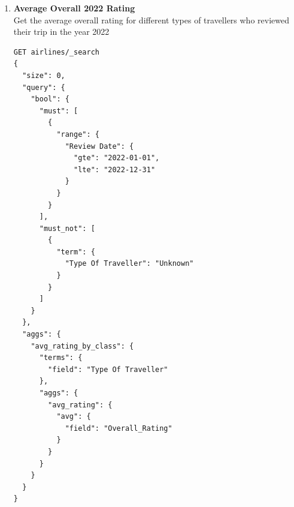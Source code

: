 \documentclass{Configuration_Files/PoliMi3i_thesis}
\begin{document}
\begin{enumerate}
    \item \textbf{Average Overall 2022 Rating} \\
    Get the average overall rating for different types of travellers who reviewed their trip in the year 2022

\begin{verbatim}
GET airlines/_search
{
  "size": 0,
  "query": {
    "bool": {
      "must": [
        {
          "range": {
            "Review Date": {
              "gte": "2022-01-01",
              "lte": "2022-12-31"
            }
          }
        }
      ],
      "must_not": [
        {
          "term": {
            "Type Of Traveller": "Unknown"
          }
        }
      ]
    }
  },
  "aggs": {
    "avg_rating_by_class": {
      "terms": {
        "field": "Type Of Traveller"
      },
      "aggs": {
        "avg_rating": {
          "avg": {
            "field": "Overall_Rating"
          }
        }
      }
    }
  }
}

\end{verbatim}

\newpage


\end{enumerate}
\end{document}
